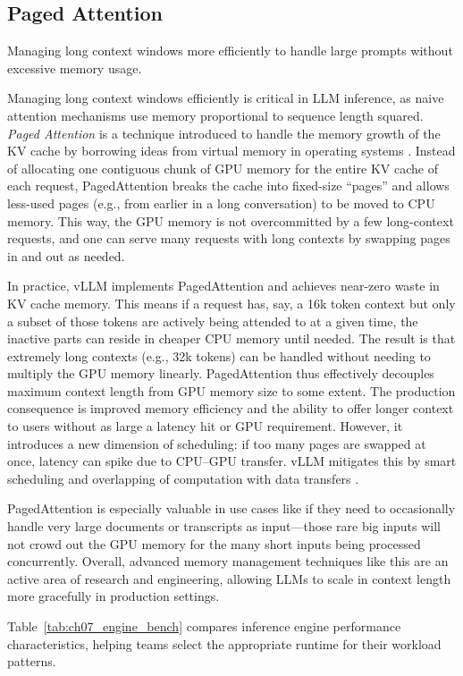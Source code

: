 \subsection{Paged Attention}
Managing long context windows more efficiently to handle large prompts without excessive memory usage.

Managing long context windows efficiently is critical in LLM inference, as naive attention mechanisms use memory proportional to sequence length squared. \textit{Paged Attention} is a technique introduced to handle the memory growth of the KV cache by borrowing ideas from virtual memory in operating systems \cite{Kwon2023vLLM}. Instead of allocating one contiguous chunk of GPU memory for the entire KV cache of each request, PagedAttention breaks the cache into fixed-size ``pages'' and allows less-used pages (e.g., from earlier in a long conversation) to be moved to CPU memory. This way, the GPU memory is not overcommitted by a few long-context requests, and one can serve many requests with long contexts by swapping pages in and out as needed.

In practice, vLLM implements PagedAttention and achieves near-zero waste in KV cache memory. This means if a request has, say, a 16k token context but only a subset of those tokens are actively being attended to at a given time, the inactive parts can reside in cheaper CPU memory until needed. The result is that extremely long contexts (e.g., 32k tokens) can be handled without needing to multiply the GPU memory linearly. PagedAttention thus effectively decouples maximum context length from GPU memory size to some extent. The production consequence is improved memory efficiency and the ability to offer longer context to users without as large a latency hit or GPU requirement. However, it introduces a new dimension of scheduling: if too many pages are swapped at once, latency can spike due to CPU--GPU transfer. vLLM mitigates this by smart scheduling and overlapping of computation with data transfers \cite{Kwon2023vLLM}.

PagedAttention is especially valuable in use cases like \ishtar{} if they need to occasionally handle very large documents or transcripts as input---those rare big inputs will not crowd out the GPU memory for the many short inputs being processed concurrently. Overall, advanced memory management techniques like this are an active area of research and engineering, allowing LLMs to scale in context length more gracefully in production settings.

Table~\ref{tab:ch07_engine_bench} compares inference engine performance characteristics, helping teams select the appropriate runtime for their workload patterns.

